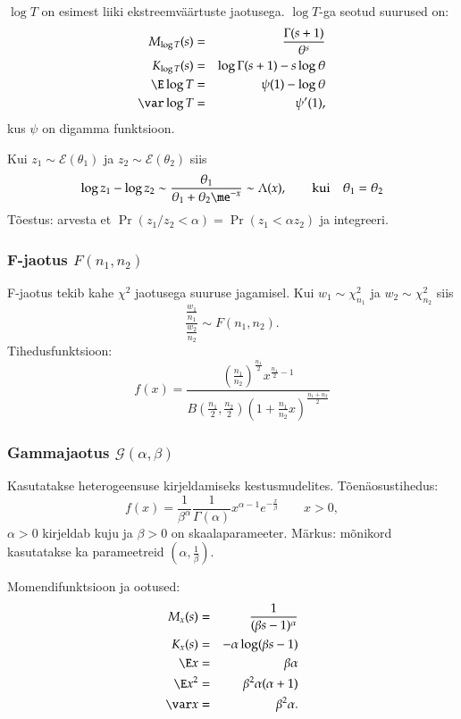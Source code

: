 \documentclass[a4paper]{article}
\numberwithin{equation}{subsection}
\begin{document}
$\log T$ on esimest liiki ekstreemväärtuste jaotusega. $\log T$-ga
seotud suurused on:
\begin{eqnarray}
M_{\log T} (s) &=& \frac{\Gamma(s+1)}{\theta^s}\\
K_{\log T} (s) &=& \log \Gamma(s+1) - s \log \theta\\
\E \log T &=& \psi(1) - \log \theta\\
\var \log T &=& \psi'(1),
\end{eqnarray}
kus $\psi$ on digamma funktsioon.

Kui $z_1 \sim \mathcal{E}(\theta_1)$ ja $z_2 \sim
\mathcal{E}(\theta_2)$ siis
\begin{equation}
  \log z_1 - \log z_2 \sim \frac{\theta_1}{\theta_1 + \theta_2
  \me^{-x}} \sim \Lambda(x), \qquad \mbox{kui} \quad \theta_1 = \theta_2
\end{equation}
Tõestus: arvesta et $\Pr(z_1/z_2 < \alpha) = \Pr(z_1 < \alpha z_2)$ ja
integreeri. 


\subsubsection{F-jaotus $F(n_1, n_2)$}
F-jaotus tekib kahe $\chi^2$ jaotusega suuruse jagamisel.  Kui $w_1
\sim \chi_{n_1}^2$ ja $w_2 \sim \chi_{n_2}^2$ siis
\begin{equation}
\frac{\frac{w_1}{n_1}} {\frac{w_2}{n_2}} \sim F( n_1, n_2).
\end{equation}
Tihedusfunktsioon:
\begin{equation}
f(x) = \frac{
  \left(\frac{n_1}{n_2}\right)^\frac{n_1}{2} x^{\frac{n_1}{2}-1}}
  {B\left( \frac{n_1}{2}, \frac{n_2}{2} \right)
    \left( 1 + \frac{n_1}{n_2}x\right)^\frac{n_1+n_2}{2} }
\end{equation}


\subsubsection{Gammajaotus $\mathcal{G(\alpha,\beta)}$}
Kasutatakse heterogeensuse kirjeldamiseks kestusmudelites.
Tõenäosustihedus:
\begin{equation}
f(x) = \frac{1}{\beta^\alpha} \frac{1}{\Gamma( \alpha)} x^{\alpha-1}
  e^{-\frac{x}{\beta}} \qquad x > 0,
\end{equation}
$\alpha >0$ kirjeldab kuju ja $\beta>0$ on skaalaparameeter.  Märkus:
mõnikord kasutatakse ka parameetreid $(\alpha,\frac{1}{\beta})$.

Momendifunktsioon ja ootused:
\begin{eqnarray}
M_x (s) &=& \frac{1}{(\beta s - 1)^\alpha}\\
K_x (s) &=& -\alpha \log(\beta s - 1)\\
\E x &=& \beta \alpha \\
\E x^2 &=& \beta^2 \alpha( \alpha + 1) \\
\var x &=& \beta^2 \alpha.
\end{eqnarray}
\end{document}
